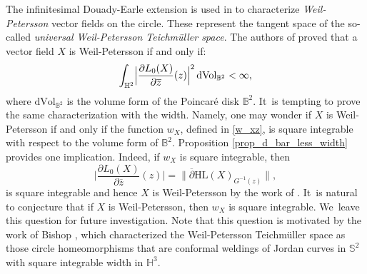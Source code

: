 \begin{remark}\label{remark_weil_petersson}
The infinitesimal Douady-Earle extension is used in \cite{integral_operator_Zygmund} to characterize \emph{Weil-Petersson} vector fields on the circle. These represent the tangent space of the so-called \emph{universal Weil-Petersson Teichmüller space}. The authors of \cite{integral_operator_Zygmund} proved that a vector field $X$ is Weil-Petersson if and only if:
\[ \int_{\mathbb{H}^2} \Bigl|\frac{\partial L_0(X)}{\partial \overline{z}}(z)\Bigr| ^2 \, \mathrm{d}\mathrm{Vol}_{\mathbb{B}^2} <\infty,\] where $\mathrm{d}\mathrm{Vol}_{\mathbb{B}^2} $ is the volume form of the Poincaré disk $\mathbb{B}^2$. It~is tempting to prove the same characterization with the width. Namely, one may wonder if $X$ is Weil-Petersson if and only if the function $w_X$, defined in \eqref{w_xz}, is square integrable with respect to the volume form of $\mathbb{B}^2$. Proposition \ref{prop_d_bar_less_width} provides one implication. Indeed, if $w_X$ is square integrable, then
\[
\biggl|\frac{\partial L_0(X)}{\partial \overline{z}}(z)\biggr| =\rVert\overline{\partial}\mathrm{HL}(X)_{G^{-1}(z)}\lVert,
\]
is square integrable and hence $X$ is Weil-Petersson by the work of \cite{integral_operator_Zygmund}. It~is natural to conjecture that if $X$ is Weil-Petersson, then $w_X$ is square integrable. We~leave this question for future investigation. Note that this question is motivated by the work of Bishop \cite{bishop}, which characterized the Weil-Petersson Teichmüller space as those circle homeomorphisms that are conformal weldings of Jordan curves in $\mathbb{S}^2$ with square integrable width in $\mathbb{H}^3$.
\end{remark}
